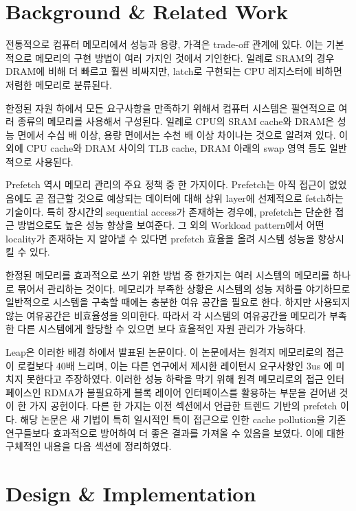 \documentclass[conference,11pt]{IEEEtran}
\begin{document}
\begin{CJK}{UTF8}{}
    \section{Background \& Related Work} \label{sec:background}

    전통적으로 컴퓨터 메모리에서 성능과 용량, 가격은 trade-off 관계에 있다. 이는 기본적으로 메모리의 구현 방법이 여러 가지인 것에서 기인한다. 일례로 SRAM의 경우 DRAM에 비해 더 빠르고 훨씬 비싸지만, latch로 구현되는 CPU 레지스터에 비하면 저렴한 메모리로 분류된다.

    한정된 자원 하에서 모든 요구사항을 만족하기 위해서 컴퓨터 시스템은 필연적으로 여러 종류의 메모리를 사용해서 구성된다. 일례로 CPU의 SRAM cache와 DRAM은 성능 면에서 수십 배 이상, 용량 면에서는 수천 배 이상 차이나는 것으로 알려져 있다. 이외에 CPU cache와 DRAM 사이의 TLB cache, DRAM 아래의 swap 영역 등도 일반적으로 사용된다.

    Prefetch 역시 메모리 관리의 주요 정책 중 한 가지이다. Prefetch는 아직 접근이 없었음에도 곧 접근할 것으로 예상되는 데이터에 대해 상위 layer에 선제적으로 fetch하는 기술이다. 특히 장시간의 sequential access가 존재하는 경우에, prefetch는 단순한 접근 방법으로도 높은 성능 향상을 보여준다. 그 외의 Workload pattern에서 어떤 locality가 존재하는 지 알아낼 수 있다면 prefetch 효율을 올려 시스템 성능을 향상시킬 수 있다.

    한정된 메모리를 효과적으로 쓰기 위한 방법 중 한가지는 여러 시스템의 메모리를 하나로 묶어서 관리하는 것이다. 메모리가 부족한 상황은 시스템의 성능 저하를 야기하므로 일반적으로 시스템을 구축할 때에는 충분한 여유 공간을 필요로 한다. 하지만 사용되지 않는 여유공간은 비효율성을 의미한다. 따라서 각 시스템의 여유공간을 메모리가 부족한 다른 시스템에게 할당할 수 있으면 보다 효율적인 자원 관리가 가능하다.

    Leap은 이러한 배경 하에서 발표된 논문이다. 이 논문에서는 원격지 메모리로의 접근이 로컬보다 40배 느리며, 이는 다른 연구에서 제시한 레이턴시 요구사항인 3us \cite{osdi16} 에 미치지 못한다고 주장하였다. 이러한 성능 하락을 막기 위해 원격 메모리로의 접근 인터페이스인 RDMA가 불필요하게 블록 레이어 인터페이스를 활용하는 부분을 걷어낸 것이 한 가지 공헌이다. 다른 한 가지는 이전 섹션에서 언급한 트렌드 기반의 prefetch 이다. 해당 논문은 새 기법이 특히 일시적인 특이 접근으로 인한 cache pollution을 기존 연구들보다 효과적으로 방어하여 더 좋은 결과를 가져올 수 있음을 보였다. 이에 대한 구체적인 내용을 다음 섹션에 정리하였다.

    \section{Design \& Implementation} \label{sec:design}


\end{CJK}
\end{document}
